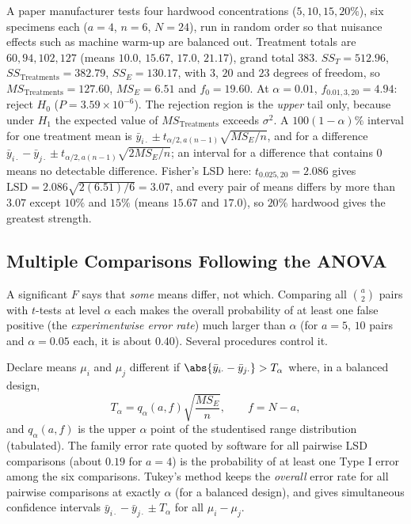 \begin{example}
A paper manufacturer tests four hardwood concentrations ($5,10,15,20\%$), six specimens each ($a=4$, $n=6$, $N=24$), run in random order so that nuisance effects such as machine warm-up are balanced out. Treatment totals are $60,94,102,127$ (means $10.0,\,15.67,\,17.0,\,21.17$), grand total $383$. $SS_T=512.96$, $SS_{\text{Treatments}}=382.79$, $SS_E=130.17$, with $3$, $20$ and $23$ degrees of freedom, so $MS_{\text{Treatments}}=127.60$, $MS_E=6.51$ and $f_0=19.60$. At $\alpha=0.01$, $f_{0.01,3,20}=4.94$: reject $H_0$ ($P=3.59\times10^{-6}$). The rejection region is the \emph{upper} tail only, because under $H_1$ the expected value of $MS_{\text{Treatments}}$ exceeds $\sigma^2$. A $100(1-\alpha)\%$ interval for one treatment mean is $\bar{y}_{i\cdot}\pm t_{\alpha/2,a(n-1)}\sqrt{MS_E/n}$, and for a difference $\bar{y}_{i\cdot}-\bar{y}_{j\cdot}\pm t_{\alpha/2,a(n-1)}\sqrt{2MS_E/n}$; an interval for a difference that contains $0$ means no detectable difference. Fisher's LSD here: $t_{0.025,20}=2.086$ gives $\mathrm{LSD}=2.086\sqrt{2(6.51)/6}=3.07$, and every pair of means differs by more than $3.07$ except $10\%$ and $15\%$ (means $15.67$ and $17.0$), so $20\%$ hardwood gives the greatest strength.
\end{example}

\subsection{Multiple Comparisons Following the ANOVA}

A significant $F$ says that \emph{some} means differ, not which. Comparing all $\binom a2$ pairs with $t$-tests at level $\alpha$ each makes the overall probability of at least one false positive (the \emph{experimentwise error rate}) much larger than $\alpha$ (for $a=5$, $10$ pairs and $\alpha=0.05$ each, it is about $0.40$). Several procedures control it.

\begin{definition}
Declare means $\mu_i$ and $\mu_j$ different if $\abs{\bar{y}_{i\cdot}-\bar{y}_{j\cdot}}>T_\alpha$ where, in a balanced design,
\[ T_\alpha=q_\alpha(a,f)\sqrt{\frac{MS_E}n},\qquad f=N-a, \]
and $q_\alpha(a,f)$ is the upper $\alpha$ point of the studentised range distribution (tabulated). The family error rate quoted by software for all pairwise LSD comparisons (about $0.19$ for $a=4$) is the probability of at least one Type I error among the six comparisons. Tukey's method keeps the \emph{overall} error rate for all pairwise comparisons at exactly $\alpha$ (for a balanced design), and gives simultaneous confidence intervals $\bar{y}_{i\cdot}-\bar{y}_{j\cdot}\pm T_\alpha$ for all $\mu_i-\mu_j$.
\end{definition}

